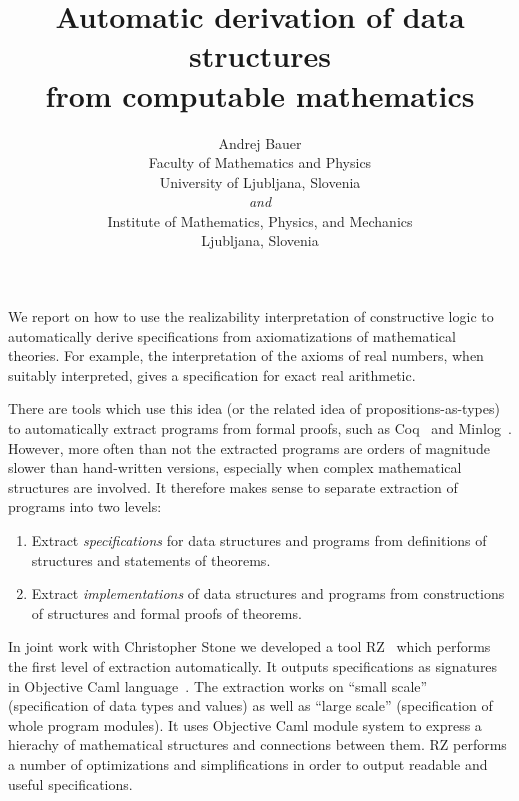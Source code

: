 \documentclass{article}
\begin{document}
\title{Automatic derivation of data structures \\
  from computable mathematics}
\author{Andrej Bauer\\
Faculty of Mathematics and Physics\\
University of Ljubljana, Slovenia\\
\emph{and}\\
Institute of Mathematics, Physics, and Mechanics\\
Ljubljana, Slovenia
}

\maketitle

We report on how to use the realizability interpretation of
constructive logic to automatically derive specifications from
axiomatizations of mathematical theories. For example, the
interpretation of the axioms of real numbers, when suitably
interpreted, gives a specification for exact real arithmetic.

There are tools which use this idea (or the related idea of
propositions-as-types) to automatically extract programs from formal
proofs, such as Coq~\cite{Coq} and Minlog~\cite{Minlog}. However, more
often than not the extracted programs are orders of magnitude slower
than hand-written versions, especially when complex mathematical
structures are involved.
%
It therefore makes sense to separate extraction of programs into two levels:
%
\begin{enumerate}
\item Extract \emph{specifications} for data structures and programs from
  definitions of structures and statements of theorems.
\item Extract \emph{implementations} of data structures and programs from
  constructions of structures and formal proofs of theorems.
\end{enumerate}
%
In joint work with Christopher Stone we developed a tool RZ~\cite{RZ,RZWeb}
which performs the first level of extraction automatically. It outputs
specifications as signatures in Objective Caml language~\cite{Ocaml}.
The extraction works on ``small scale'' (specification of data types
and values) as well as ``large scale'' (specification of whole program
modules). It uses Objective Caml module system to express a hierachy
of mathematical structures and connections between them. RZ performs a
number of optimizations and simplifications in order to output
readable and useful specifications.
\end{document}
